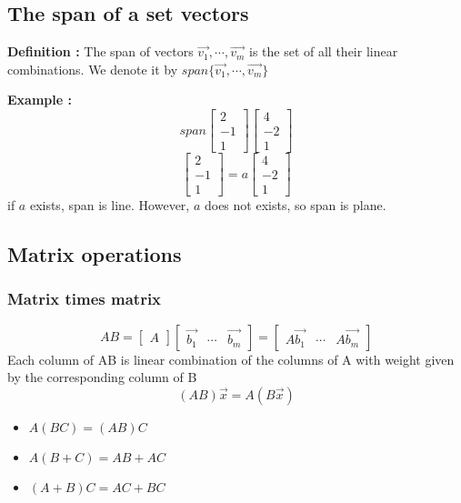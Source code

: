 \documentclass{article}
\begin{document}
\subsection{The span of a set vectors}
\textbf{Definition : }
The span of vectors $\vec{v_1}, \cdots , \vec{v_m}$ is the set of all their linear combinations. We denote it by $span \{\vec{v_1}, \cdots , \vec{v_m}\}$

\textbf{Example :}
\[
span
\begin{bmatrix}
    2\\
    -1 \\
    1
\end{bmatrix}
\begin{bmatrix}
    4\\
    -2\\
    1
\end{bmatrix}
\]\[
\begin{bmatrix}
    2\\
    -1\\
    1
\end{bmatrix}
=
a
\begin{bmatrix}
    4\\
    -2\\
    1
\end{bmatrix}
\]
if $a$ exists, span is line. However, $a$ does not exists, so span is plane.

\subsection{Matrix operations}
\subsubsection{Matrix times matrix}
\[
AB = 
\begin{bmatrix}
    A
\end{bmatrix}
\begin{bmatrix}
    \vec{b_1} & \cdots & \vec{b_m}
\end{bmatrix}
=
\begin{bmatrix}
    A\vec{b_1} & \cdots & A\vec{b_m}
\end{bmatrix}
\]
Each column of AB is linear combination of the columns of A with weight given by the corresponding column of B
\[
(AB)\vec{x} = A(B\vec{x})
\]
\begin{itemize}
    \item $A(BC) = (AB)C$
    \item $A(B+C) = AB+AC$
    \item $(A+B)C = AC + BC$
\end{itemize}
\end{document}
